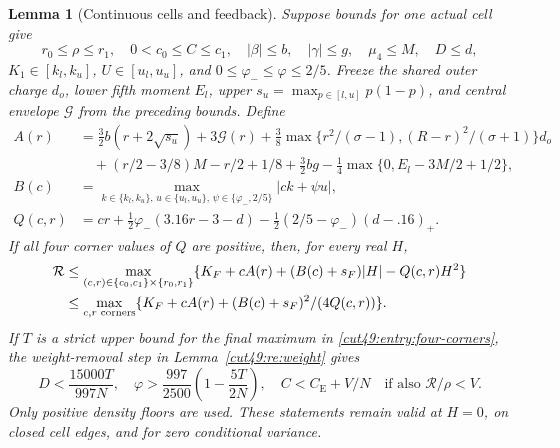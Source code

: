 \documentclass[11pt,a4paper]{article}
\numberwithin{equation}{section}
\newtheorem{lemma}[theorem]{Lemma}
\theoremstyle{definition}
\theoremstyle{remark}
\newcommand{\CE}{C_{\mathrm E}}
\newcommand{\cR}{\mathcal R}
\begin{document}
\begin{lemma}[Continuous cells and feedback]\label{cut49:entry:cell-theorem}\label{cut49:entry:corners}
Suppose bounds for one actual cell give
\[
 r_0\le\rho\le r_1,\quad0<c_0\le C\le c_1,\quad
 |\beta|\le b,\quad |\gamma|\le g,\quad \mu_4\le M,\quad D\le d,
\]
$K_1\in[k_l,k_u]$, $U\in[u_l,u_u]$, and
$0\le\varphi_-\le\varphi\le2/5$. Freeze the shared outer charge $d_o$,
lower fifth moment $E_l$, upper $s_u=\max_{p\in[l,u]}p(1-p)$, and
central envelope $\mathcal G$ from the preceding bounds.
Define
\begin{align*}
 A(r)&=\tfrac32 b(r+2\sqrt{s_u})+3\mathcal G(r)
 +\tfrac38\max\{r^2/(\sigma-1),(R-r)^2/(\sigma+1)\}d_o\\
 &\quad +(r/2-3/8)M-r/2+1/8+\tfrac32bg
 -\tfrac14\max\{0,E_l-3M/2+1/2\},\\
 B(c)&=\max_{k\in\{k_l,k_u\},\,u\in\{u_l,u_u\},\,
                      \psi\in\{\varphi_-,2/5\}}|ck+\psi u|,\\
 Q(c,r)&=cr+\tfrac12\varphi_-(3.16r-3-d)
       -\tfrac12(2/5-\varphi_-)(d-.16)_+.
\end{align*}
If all four corner values of $Q$ are positive, then, for every real $H$,
\begin{align}
 \cR&\le\max_{(c,r)\in\{c_0,c_1\}\times\{r_0,r_1\}}
       \{K_F+cA(r)+(B(c)+s_F)|H|-Q(c,r)H^2\}\notag\\
 &\le\max_{c,r\text{ corners}}
       \{K_F+cA(r)+(B(c)+s_F)^2/(4Q(c,r))\}.           \label{cut49:entry:four-corners}
\end{align}
If $T$ is a strict upper bound for the final maximum in
\eqref{cut49:entry:four-corners}, the weight-removal step in
Lemma~\ref{cut49:re:weight} gives
\begin{equation}\label{cut49:entry:feedback-values}
 D<\frac{15000T}{997N},\quad
 \varphi>\frac{997}{2500}\left(1-\frac{5T}{2N}\right),\quad
 C<\CE+V/N\quad\text{if also }\cR/\rho<V.
\end{equation}
Only positive density floors are used. These statements remain valid at
$H=0$, on closed cell edges, and for zero conditional variance.
\end{lemma}
\end{document}
